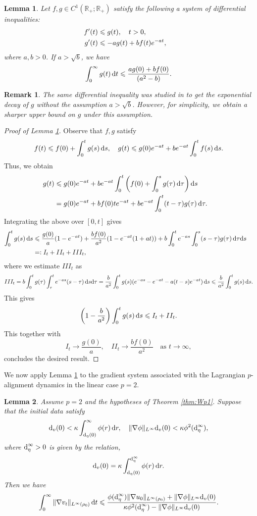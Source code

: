 \documentclass[10pt,reqno]{amsart}
\renewcommand{\leq}{\leqslant}
\numberwithin{equation}{section}
\newtheorem{lemma}{Lemma}[section]
\newtheorem{remark}{Remark}[section]
\newcommand{\R}{\mathbb R}
\newcommand{\lt}{\left}
\newcommand{\rt}{\right}
\newcommand{\rd}{\textnormal{d}}
\newcommand{\dr}{\textnormal{d}r}
\newcommand{\dt}{\textnormal{d}t}
\newcommand{\ds}{\textnormal{d}s}
\begin{document}
 \begin{lemma}\label{lem:tech} Let $f,g \in C^1(\R_+; \R_+)$ satisfy the following a system of differential inequalities:
\begin{align*}
f'(t) &\leq g(t),\quad t > 0,\cr
g'(t) &\leq -a g(t) + b f(t) e^{-at},
\end{align*}
where $a,b > 0$. If $a > \sqrt{b}$, we have
\[
\int_0^\infty g(t)\,\dt \leq \frac{ag(0) + bf(0)}{(a^2-b)}. 
\]
 \end{lemma}
 \begin{remark}\label{rmk_tech0} The same differential inequality was studied in \cite[Lemma 3.1]{HKZ18} to get the exponential decay of $g$ without the assumption $a > \sqrt b$. However, for simplicity, we obtain a sharper upper bound on $g$ under this assumption.
 \end{remark}
 \begin{proof}[Proof of Lemma \ref{lem:tech}] Observe that $f,g$ satisfy
 \[
 f(t) \leq f(0) + \int_0^t g(s)\,\ds, \quad g(t) \leq g(0) e^{-at} + b e^{-at} \int_0^t f(s)\,\ds.
 \]
 Thus, we obtain
\begin{align*}
 g(t) &\leq g(0) e^{-at} + b e^{-at} \int_0^t \lt(f(0) + \int_0^s g(\tau)\,\rd\tau \rt) \ds \cr
 &= g(0) e^{-at} + b f(0) t e^{-at} + b e^{-at} \int_0^t (t-\tau) g(\tau)\,\rd\tau.
\end{align*}
Integrating the above over $[0,t]$ gives
\begin{align*}
\int_0^t g(s)\,\ds &\leq \frac{g(0)}{a} (1 - e^{-at}) + \frac{bf(0)}{a^2}(1 - e^{-at}(1+at)) + b\int_0^t e^{-as} \int_0^s(s-\tau) g(\tau)\,\rd\tau \ds\cr
&=: I_t + II_t + III_t,
\end{align*}
where we estimate $III_t$ as
\[
III_t = b \int_0^t g(\tau) \int_\tau^t e^{-as} (s-\tau)\,\ds \rd\tau = \frac{b}{a^2}\int_0^t g(s) (e^{-as} - e^{-at} - a(t-s)e^{-at})\,\ds \leq \frac{b}{a^2}\int_0^t g(s) \,\ds.
\]
This gives
\[
\lt(1 - \frac{b}{a^2} \rt)\int_0^t g(s)\,\ds \leq I_t + II_t.
\]
This together with
\[
I_t \to \frac{g(0)}{a}, \quad II_t \to \frac{bf(0)}{a^2} \quad \text{as } t \to \infty,
\]
concludes the desired result.
 \end{proof}
 
We now apply Lemma \ref{lem:tech} to the gradient system associated with the Lagrangian $p$-alignment dynamics in the linear case $p=2$.

\begin{lemma}\label{lem:uni_g} Assume $p=2$ and the hypotheses of Theorem \ref{thm:Wp1}. Suppose that the initial data satisfy
\[
\rd_v(0) <  \kappa \int_{\rd_\eta(0)}^\infty \phi(r)\,\dr, \quad   \|\nabla\phi\|_{L^\infty} \rd_v(0) < \kappa \phi^2(\rd_\eta^\infty),
\]
where $\rd_\eta^\infty > 0$ is given by the relation,
\[
\rd_v(0) =   \kappa \int_{\rd_\eta(0)}^{\rd_\eta^\infty} \phi(r)\,\dr.
\]
 Then we have
 \[
 \int_0^\infty \|\nabla v_t\|_{L^\infty(\rho_0)}\,\dt \leq \frac{\phi(\rd_\eta^\infty)\|\nabla u_0\|_{L^\infty(\rho_0)}+ \|\nabla\phi\|_{L^\infty} \rd_v(0)}{\kappa \phi^2(\rd_\eta^\infty) - \|\nabla\phi\|_{L^\infty} \rd_v(0)}.
 \]
\end{lemma}
\end{document}
